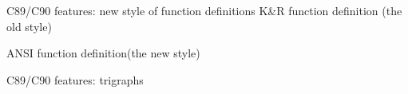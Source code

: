 \begin{frame}{C89/C90 features: new style of function definitions}
    K\&R function definition (the old style)
    
    ANSI function definition(the new style)
    
\end{frame}
\begin{frame}{C89/C90 features: trigraphs}
        \begin{center}
        \end{center}
\end{frame}
